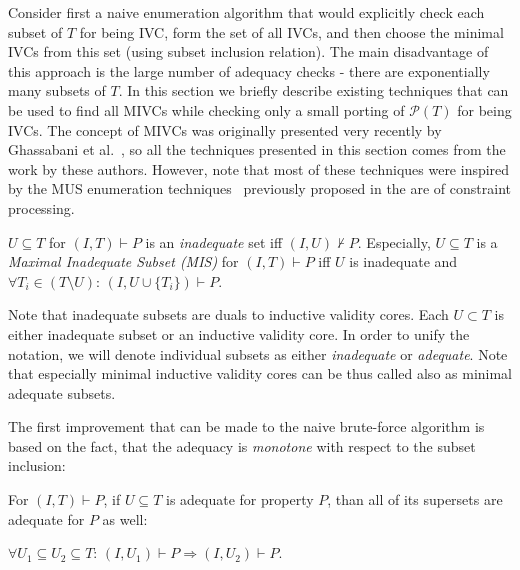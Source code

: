 \newcommand{\fUnex}{f_{\mathit{Unexplored}}}


Consider
first a naive enumeration algorithm that would explicitly check each subset of $T$ for being IVC,
form the set of all IVCs, and then choose the minimal IVCs from this set (using subset inclusion relation). The main disadvantage of this approach
is the large number of adequacy checks - there are exponentially many subsets of $T$. In this section we briefly describe existing techniques that can be used to find all MIVCs while checking only a small porting of $\mathcal{P}(T)$ for being IVCs. The concept of MIVCs was originally presented very recently by Ghassabani et al.~\cite{}, so all the techniques presented in this section comes from the work by these authors. However, note that most of these techniques were inspired by the MUS enumeration techniques~\cite{} previously proposed in the are of constraint processing. 



\begin{definition}[Inadequacy] $U \subseteq T$ for $(I, T) \vdash P$ is an \emph{inadequate} set iff $(I, U) \nvdash P$. Especially, $U \subseteq T$ is a \emph{Maximal Inadequate Subset (MIS)} for $(I, T) \vdash P$ iff $U$ is inadequate and $\forall T_i \in (T \setminus U): \, (I, U \cup \{ T_i\}) \vdash P$.
\end{definition}

Note that inadequate subsets are duals to inductive validity cores. Each $U \subset T$ is either inadequate subset or an inductive validity core. In order to unify the notation, we will denote individual subsets as either \emph{inadequate} or \emph{adequate}. Note that especially minimal inductive validity cores can be thus called also as minimal adequate subsets.  



The first improvement that can be made to the naive brute-force algorithm is based on the fact, that the adequacy is \emph{monotone} with respect to the subset inclusion: 

\begin{lemma}[Monotonicity]
\label{lemma:monotonicity}
For $(I, T) \vdash P$, if $U \subseteq T$ is adequate for property $P$, than all of its supersets are adequate for $P$ as well:
\begin{center}
$\forall U_1 \subseteq U_2 \subseteq T: \, (I, U_1) \vdash P \Rightarrow (I, U_2) \vdash P$.
\end{center}
\end{lemma}

